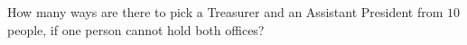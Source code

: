 How many ways are there to pick a Treasurer and an Assistant President from $10$ people, if one person cannot hold both offices?

